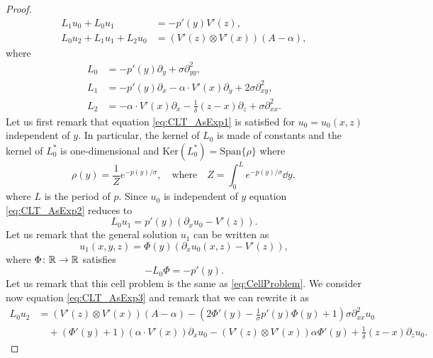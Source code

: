 \documentclass[10pt]{article}
\begin{document}
\begin{proof}
\begin{align}
		L_1 u_0 + L_0 u_1 &= - p'(y) V'(z), \label{eq:CLT_AsExp2}\\
		L_0 u_2 + L_1 u_1 + L_2 u_0 &= \left(V'(z) \otimes V'(x)\right) (A - \alpha),\label{eq:CLT_AsExp3}
	\end{align}
	where 
	\begin{equation}
	\begin{aligned}
		L_0 &= -p'(y) \partial_y + \sigma \partial^2_{yy},\\
		L_1 &= -p'(y) \partial_x - \alpha \cdot V'(x) \partial_y + 2 \sigma \partial^2_{xy}, \\
		L_2 &= 	-\alpha \cdot V'(x) \partial_x - \frac1{\delta}(z - x)	\partial_z + \sigma \partial^2_{xx}.
	\end{aligned}
	\end{equation}
	Let us first remark that equation \eqref{eq:CLT_AsExp1} is satisfied for $u_0 = u_0(x, z)$ independent of $y$. In particular, the kernel of $L_0$ is made of constants and the kernel of $L_0^*$ is one-dimensional and $\mathrm{Ker}(L_0^*) = \mathrm{Span}\{\rho\}$ where
	\begin{equation}\label{eq:CLT_Invariant}
		\rho(y) = \frac1Z e^{-p(y)/\sigma}, \quad\text{where}\quad Z = \int_0^L e^{-p(y)/\sigma} \dd y,
	\end{equation} 
	where $L$ is the period of $p$. Since $u_0$ is independent of $y$ equation \eqref{eq:CLT_AsExp2} reduces to 
	\begin{equation}
		L_0 u_1 = p'(y)\left(\partial_x u_0 -V'(z)\right).
	\end{equation}
	Let us remark that the general solution $u_1$ can be written as
	\begin{equation}
		u_1(x,y,z) = \Phi(y)\left(\partial_x u_0(x, z) - V'(z)\right),
	\end{equation}
	where $\Phi \colon \mathbb{R} \to \mathbb{R}$ satisfies
	\begin{equation}
		-L_0 \Phi = -p'(y).
	\end{equation} 
	Let us remark that this cell problem is the same as \eqref{eq:CellProblem}. We consider now equation \eqref{eq:CLT_AsExp3} and remark that we can rewrite it as
	\begin{equation}
	\begin{aligned}
		L_0 u_2 &= (V'(z) \otimes V'(x))(A - \alpha) - \left(2\Phi'(y) - \frac1\sigma p'(y) \Phi(y) + 1\right) \sigma \partial^2_{xx}u_0 \\
		&\quad +\left(\Phi'(y) + 1\right) \left( \alpha \cdot V'(x) \right) \partial_x u_0 - \left(V'(z) \otimes V'(x) \right)\alpha \Phi'(y) + \frac1\delta(z-x) \partial_z u_0.

\end{aligned}
\end{equation}
\end{proof}
\end{document}
